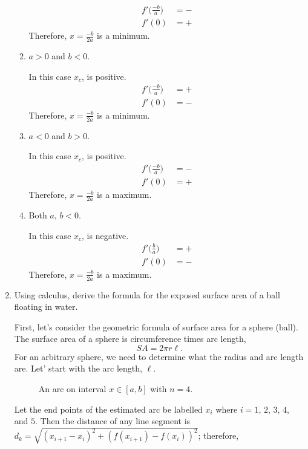 \begin{enumerate}
\begin{enumerate}[label = {Case \arabic*:}]
    \begin{align*}
      f'\big(\frac{-b}{a}\big) &= -\\
      f'(0) &= +
    \end{align*}
    Therefore, \(x = \frac{-b}{2a}\) is a minimum.
  \item
    \(a > 0\) and \(b < 0\).
    \par\smallskip
    In this case \(x_c\), is positive.
    \begin{align*}
      f'\big(\frac{-b}{a}\big) &= +\\
      f'(0) &= - 
    \end{align*}
    Therefore, \(x = \frac{-b}{2a}\) is a minimum.
  \item
    \(a < 0\) and \(b > 0\).
    \par\smallskip
    In this case \(x_c\), is positive.
    \begin{align*}
      f'\big(\frac{-b}{a}\big) &= -\\
      f'(0) &= + 
    \end{align*}
    Therefore, \(x = \frac{-b}{2a}\) is a maximum.
  \item
    Both \(a\), \(b < 0\).
    \par\smallskip
    In this case \(x_c\), is negative.
    \begin{align*}
      f'\big(\frac{b}{a}\big) &= +\\
      f'(0) &= - 
    \end{align*}
    Therefore, \(x = \frac{-b}{2a}\) is a maximum.
  \end{enumerate}
\item
  Using calculus, derive the formula for the exposed surface area of a ball
  floating in water.
  \par\smallskip
  First, let's consider the geometric formula of surface area for a sphere
  (ball).
  The surface area of a sphere is circumference times arc length,
  \[
  SA = 2\pi r\ell.
  \]
  For an arbitrary sphere, we need to determine what the radius and arc length
  are.
  Let' start with the arc length, \(\ell\).
  \begin{figure}[H]
    \centering
    
    \caption{An arc on interval \(x\in[a, b]\) with \(n = 4\).}
  \end{figure}
  Let the end points of the estimated arc be labelled \(x_i\) where
  \(i = 1\), \(2\), \(3\), \(4\), and \(5\).
  Then the distance of any line segment is
  \(d_k = \sqrt{(x_{i + 1} - x_i)^2 + (f(x_{i + 1}) - f(x_i))^2}\); therefore,

\end{enumerate}
